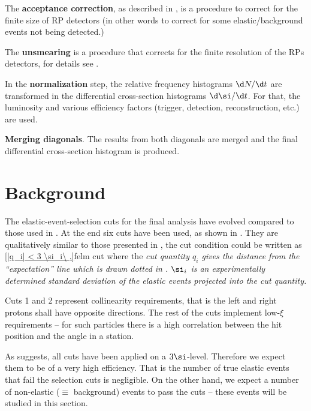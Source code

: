 \> The {\bf acceptance correction}, as described in , is a procedure to correct for the finite size of RP detectors (in other words to correct for some elastic/background events not being detected.)

\> The {\bf unsmearing} is a procedure that corrects for the finite resolution of the RPs detectors, for details see .

\> In the {\bf normalization} step, the relative frequency histograms $\d N/\d t$ are transformed in the differential cross-section histograms $\d\si/\d t$. For that, the luminosity and various efficiency factors (trigger, detection, reconstruction, etc.) are used.

\> {\bf Merging diagonals}. The results from both diagonals are merged and the final differential cross-section histogram is produced.





\section[felm bckg]{Background}

The elastic-event-selection cuts for the final analysis have evolved compared to those used in . At the end six cuts have been used, as shown in . They are qualitatively similar to those presented in , the cut condition could be written as
\eqref{|q_i| < 3 \si_i\ ,}{felm cut}
where the \em{cut quantity} $q_i$ gives the distance from the ``expectation'' line which is drawn dotted in . $\si_i$ is an experimentally determined standard deviation of the elastic events projected into the cut quantity.

Cuts 1 and 2 represent collinearity requirements, that is the left and right protons shall have opposite directions. The rest of the cuts implement low-$\xi$ requirements -- for such particles there is a high correlation between the hit position and the angle in a station.


As  suggests, all cuts have been applied on a $3\si$-level. Therefore we expect them to be of a very high efficiency. That is the number of true elastic events that fail the selection cuts is negligible. On the other hand, we expect a number of non-elastic ($\equiv$ background) events to pass the cuts -- these events will be studied in this section.


